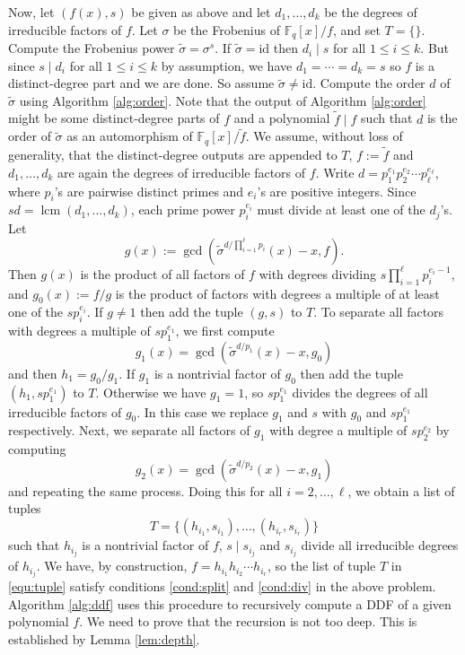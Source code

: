 \documentclass{article}
\theoremstyle{plain}
\theoremstyle{definition}
\DeclareMathOperator{\lcm}{lcm} %
\def\F{\ensuremath{\mathbb{F}}}
\begin{document}
Now, let $(f(x), s)$ be given as above and let $d_1, \dots, d_k$ be the degrees of irreducible 
factors of $f$. Let $\sigma$ be the Frobenius of $\F_q[x] / f$, and set $T = \{\}$. Compute the 
Frobenius power $\tilde{\sigma} = \sigma^s$. If $\tilde{\sigma} = \text{id}$ then $d_i \mid s$ for 
all $1 \le i \le k$. But since $s \mid d_i$ for all $1 \le i \le k$ by assumption, we have $d_1 = 
\cdots = d_k = s$ so $f$ is a distinct-degree part and we are done. So assume $\tilde{\sigma} \ne 
\text{id}$. Compute the order $d$ of $\tilde{\sigma}$ using Algorithm \ref{alg:order}. Note that 
the output of Algorithm \ref{alg:order} might be some distinct-degree parts of $f$ and a polynomial 
$\tilde{f} \mid f$ such that $d$ is the order of $\tilde{\sigma}$ as an automorphism of $\F_q[x] / 
\tilde{f}$. We assume, without loss of generality, that the distinct-degree outputs are appended to 
$T$, $f := \tilde{f}$ and $d_1, \dots, d_k$ are again the degrees of irreducible factors of $f$.
Write $d = p_1^{e_1} p_2^{e_2} \cdots p_\ell^{e_\ell}$, where $p_i$'s are pairwise 
distinct primes and $e_i$'s are positive integers. Since $sd = \lcm(d_1, \dots, d_k)$, each prime 
power $p_i^{e_i}$ must divide at least one of the $d_j$'s. Let 
\[ g(x) := \gcd(\tilde{\sigma}^{d / \prod_{i = 1}^\ell p_i}(x) - x, f). \]
Then $g(x)$ is the product of all factors of $f$ with degrees dividing $s \prod_{i = 1}^\ell 
p_i^{e_i - 1}$, and $g_0(x) := f / g$ is the product of factors with degrees a multiple of at least 
one of the $sp_i^{e_i}$. If $g \ne 1$ then add the tuple $(g, s)$ to $T$. To separate all factors 
with degrees a multiple of $sp_1^{e_1}$, we first compute
\[ g_1(x) = \gcd(\tilde{\sigma}^{d / p_1}(x) - x, g_0) \]
and then $h_1 = g_0 / g_1$. If $g_1$ is a nontrivial factor of $g_0$ then add the tuple $(h_1, 
sp_1^{e_1})$ to $T$. Otherwise we have $g_1 = 1$, so $sp_1^{e_1}$ divides the degrees of all
irreducible factors of $g_0$. In this case we replace $g_1$ and $s$ with $g_0$ and $sp_1^{e_1}$ 
respectively. Next, we separate all factors of $g_1$ with degree a multiple of $sp_2^{e_2}$ by 
computing
\[ g_2(x) = \gcd(\tilde{\sigma}^{d / p_2}(x) - x, g_1) \]
and repeating the same process. Doing this for all $i = 2, \dots, \ell$, we obtain a list of tuples
\begin{equation}
	\label{equ:tuple}
	T = \{ (h_{i_1}, s_{i_1}), \dots, (h_{i_r}, s_{i_r}) \}
\end{equation}
such that $h_{i_j}$ is a nontrivial factor of $f$, $s \mid s_{i_j}$ and $s_{i_j}$ divide all 
irreducible degrees of $h_{i_j}$. We have, by construction, $f = h_{i_1}h_{i_2} \cdots h_{i_r}$, so 
the list of tuple $T$ in \eqref{equ:tuple} satisfy conditions \ref{cond:split} and \ref{cond:div} in 
the above problem. Algorithm \ref{alg:ddf} uses this procedure to recursively compute a DDF of a 
given polynomial $f$. We need to prove that the recursion is not too deep. This is established by 
Lemma \ref{lem:depth}.
\end{document}
